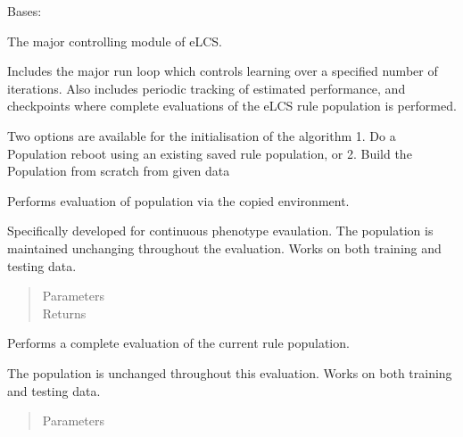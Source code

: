 \documentclass[letterpaper,10pt,english]{sphinxmanual}
\begin{document}
\begin{fulllineitems}
\label{\detokenize{eLCS:eLCS.Algorithm.Algorithm}}
Bases: 

The major controlling module of eLCS.

Includes the major run loop which controls learning over a specified number of iterations.
Also includes periodic tracking of estimated performance, and checkpoints where complete
evaluations of the eLCS rule population is performed.

Two options are available for the initialisation of the algorithm
1.  Do a Population reboot using an existing saved rule population, or
2.  Build the Population from scratch from given data

\begin{fulllineitems}
\label{\detokenize{eLCS:eLCS.Algorithm.Algorithm.doContPopEvaluation}}
Performs evaluation of population via the copied environment.

Specifically developed for continuous phenotype evaulation. The population is maintained unchanging
throughout the evaluation.  Works on both training and testing data.
\begin{quote}\begin{description}
\item[{Parameters}] \leavevmode
{} \textendash{} 

\item[{Returns}] \leavevmode


\end{description}\end{quote}

\end{fulllineitems}


\begin{fulllineitems}
\label{\detokenize{eLCS:eLCS.Algorithm.Algorithm.doPopEvaluation}}
Performs a complete evaluation of the current rule population.

The population is unchanged throughout this evaluation. Works on both training and testing data.
\begin{quote}\begin{description}
\item[{Parameters}] \leavevmode
{} \textendash{} 


\end{description}
\end{quote}
\end{fulllineitems}
\end{fulllineitems}
\end{document}
